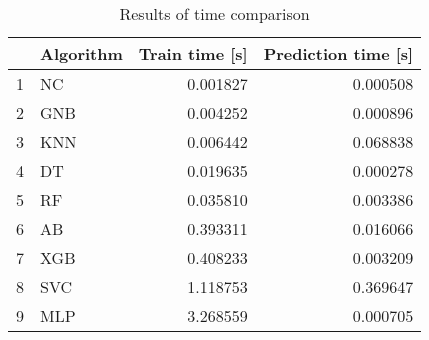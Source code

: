 \begin{table}
\footnotesize
\caption{Results of time comparison}
\label{tab:time comparison}
\begin{tabular}{llrr}
\hline
 & Algorithm & Train time [s] & Prediction time [s] \\
\hline
1 & NC & 0.001827 & 0.000508 \\
2 & GNB & 0.004252 & 0.000896 \\
3 & KNN & 0.006442 & 0.068838 \\
4 & DT & 0.019635 & 0.000278 \\
5 & RF & 0.035810 & 0.003386 \\
6 & AB & 0.393311 & 0.016066 \\
7 & XGB & 0.408233 & 0.003209 \\
8 & SVC & 1.118753 & 0.369647 \\
9 & MLP & 3.268559 & 0.000705 \\
\hline
\end{tabular}
\end{table}
